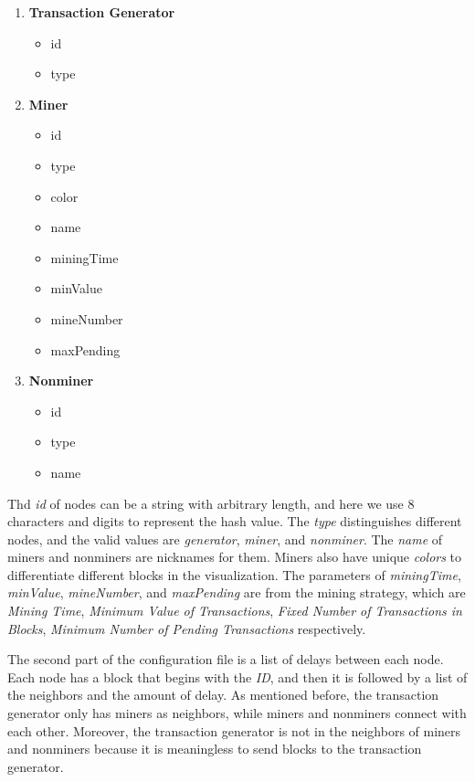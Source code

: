 \begin{enumerate}
    \item \textbf{Transaction Generator} \\
        \begin{itemize}
            \item id
            \item type
        \end{itemize}
    \item \textbf{Miner} \\
        \begin{itemize}
            \item id
            \item type
            \item color
            \item name
            \item miningTime
            \item minValue
            \item mineNumber
            \item maxPending
        \end{itemize}
    \item \textbf{Nonminer} \\
        \begin{itemize}
            \item id
            \item type
            \item name
        \end{itemize}
\end{enumerate}

Thd \textit{id} of nodes can be a string with arbitrary length, and here we use 8 characters and digits to represent the hash value. The \textit{type} distinguishes different nodes, and the valid values are \textit{generator}, \textit{miner}, and \textit{nonminer}. The \textit{name} of miners and nonminers are nicknames for them. Miners also have unique \textit{colors} to differentiate different blocks in the visualization. The parameters of \textit{miningTime}, \textit{minValue}, \textit{mineNumber}, and \textit{maxPending} are from the mining strategy, which are \textit{Mining Time}, \textit{Minimum Value of Transactions}, \textit{Fixed Number of Transactions in Blocks}, \textit{Minimum Number of Pending Transactions} respectively.

The second part of the configuration file is a list of delays between each node. Each node has a block that begins with the \textit{ID}, and then it is followed by a list of the neighbors and the amount of delay. As mentioned before, the transaction generator only has miners as neighbors, while miners and nonminers connect with each other. Moreover, the transaction generator is not in the neighbors of miners and nonminers because it is meaningless to send blocks to the transaction generator.


